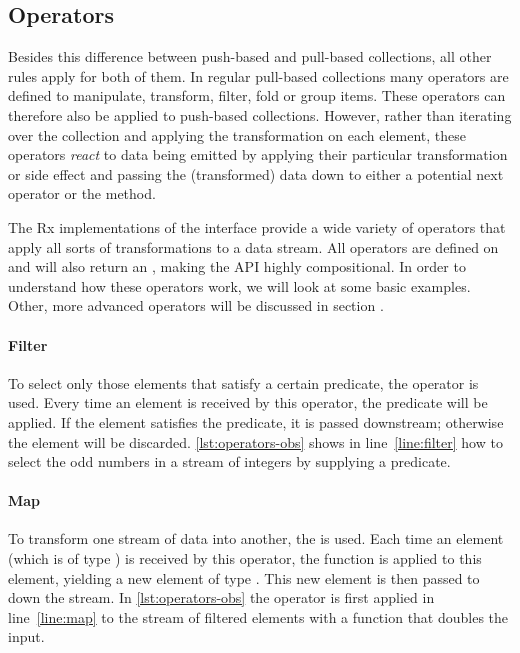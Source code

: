 \subsection{Operators}
Besides this difference between push-based and pull-based collections, all other rules apply for both of them. In regular pull-based collections many operators are defined to manipulate, transform, filter, fold or group items. These operators can therefore also be applied to push-based collections. However, rather than iterating over the collection and applying the transformation on each element, these operators \emph{react} to data being emitted by applying their particular transformation or side effect and passing the (transformed) data down to either a potential next operator or the  method.

The Rx implementations of the \obs interface provide a wide variety of operators that apply all sorts of transformations to a data stream. All operators are defined on \obs and will also return an \obs, making the API highly compositional. In order to understand how these operators work, we will look at some basic examples. Other, more advanced operators will be discussed in section .

\paragraph{Filter}To select only those elements that satisfy a certain predicate, the operator  is used. Every time an element is received by this operator, the predicate  will be applied. If the element satisfies the predicate, it is passed downstream; otherwise the element will be discarded. \autoref{lst:operators-obs} shows in line~\ref{line:filter} how to select the odd numbers in a stream of integers by supplying a predicate.

\paragraph{Map}To transform one stream of data into another, the  is used. Each time an element (which is of type ) is received by this operator, the function  is applied to this element, yielding a new element of type . This new element is then passed to down the stream. In \autoref{lst:operators-obs} the  operator is first applied in line~\ref{line:map} to the stream of filtered elements with a function that doubles the input.

